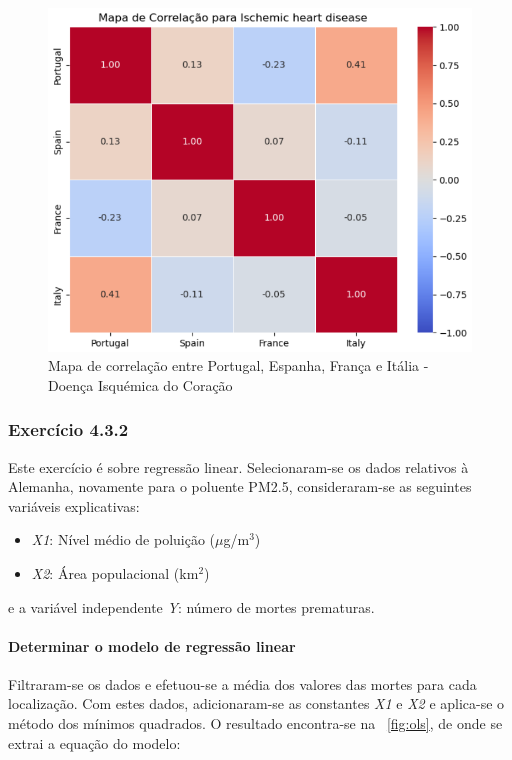 \documentclass[conference]{IEEEtran}
\begin{document}
\begin{figure}
	\centering
	\includegraphics[width=0.9\linewidth]{Mapa_Correlacao_Ischemic_Heart_Disease}
	\caption{Mapa de correlação entre Portugal, Espanha, França e Itália - Doença Isquémica do Coração}
	\label{fig:mapacorrelacaoischemicheartdisease}
\end{figure}

\medskip

\subsubsection{\textbf{Exercício 4.3.2}}

Este exercício é sobre regressão linear. Selecionaram-se os dados relativos à Alemanha, novamente para o poluente PM2.5, consideraram-se as seguintes variáveis explicativas:

\begin{itemize}
	\item \textit{X1}: Nível médio de poluição ($\mu$g/m$^{3}$)
	\item \textit{X2}: Área populacional (km$^{2}$) 
\end{itemize}
e a variável independente \textit{Y}: número de mortes prematuras.
\medskip
\paragraph{\textbf{Determinar o modelo de regressão linear}}

Filtraram-se os dados e efetuou-se a média dos valores das mortes para cada localização. 
Com estes dados, adicionaram-se as constantes \textit{X1} e \textit{X2} e aplica-se o método dos mínimos quadrados. O resultado encontra-se na \figurename~\ref{fig:ols}, de onde se extrai a equação do modelo:
\end{document}
